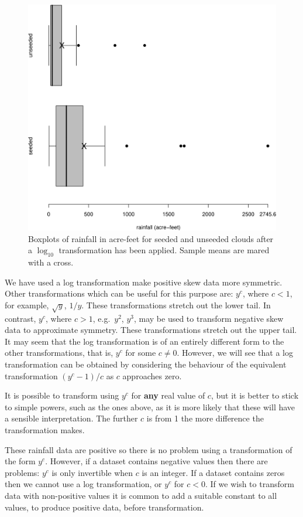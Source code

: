 \documentclass[
  11pt,
  british,
  openany, a4paper]{book}
\begin{document}
\begin{figure}

{\centering \includegraphics[width=0.75\linewidth]{images/cloud_box} 

}

\caption{Boxplots of rainfall in acre-feet for seeded and unseeded clouds after a $\log_{10}$ transformation has been applied.  Sample means are mared with a cross.}\label{fig:cloudboxlog}
\end{figure}

We have used a log transformation make positive skew data more symmetric. Other transformations which can be useful for this purpose are: \(y^c\), where \(c<1\), for example, \(\sqrt{y}\), \(1/y\). These transformations stretch out the lower tail. In contrast, \(y^c\), where \(c>1\), e.g.~\(y^2\), \(y^3\), may be used to transform negative skew data to approximate symmetry. These transformations stretch out the upper tail. It may seem that the log transformation is of an entirely different form to the other transformations, that is, \(y^c\) for some \(c \neq 0\). However, we will see that a log transformation can be obtained by considering the behaviour of the equivalent transformation \((y^c - 1) / c\) as \(c\) approaches zero.

It is possible to transform using \(y^c\) for \textbf{any} real value of \(c\), but it is better to stick to simple powers, such as the ones above, as it is more likely that these will have a sensible interpretation. The further \(c\) is from 1 the more difference the transformation makes.

These rainfall data are positive so there is no problem using a transformation of the form \(y^c\). However, if a dataset contains negative values then there are problems: \(y^c\) is only invertible when \(c\) is an integer. If a dataset contains zeros then we cannot use a log transformation, or \(y^c\) for \(c < 0\). If we wish to transform data with non-positive values it is common to add a suitable constant to all values, to produce positive data, before transformation.
\end{document}
